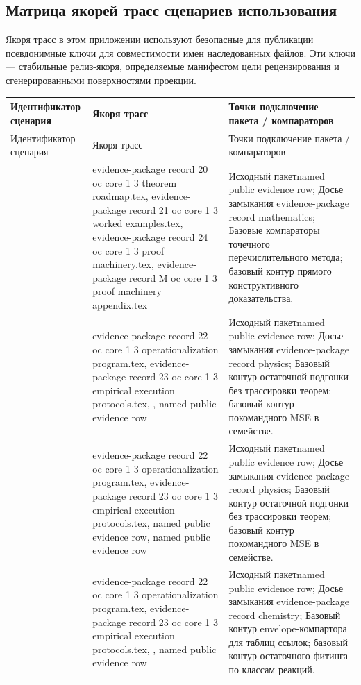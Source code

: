 \subsection{Матрица якорей трасс сценариев использования}
Якоря трасс в этом приложении используют безопасные для публикации псевдонимные ключи для совместимости имен наследованных файлов. Эти ключи — стабильные релиз-якоря, определяемые манифестом цели рецензирования и сгенерированными поверхностями проекции.
\begin{longtable}{@{}L{0.16\textwidth}L{0.38\textwidth}L{0.34\textwidth}@{}}
\toprule
Идентификатор сценария & Якоря трасс & Точки подключение пакета / компараторов \\
\midrule
\endfirsthead
\toprule
Идентификатор сценария & Якоря трасс & Точки подключение пакета / компараторов \\
\midrule
\endhead
{} & evidence-package record 20 oc core 1 3 theorem roadmap.tex, \allowbreak evidence-package record 21 oc core 1 3 worked examples.tex, \allowbreak evidence-package record 24 oc core 1 3 proof machinery.tex, \allowbreak evidence-package record M oc core 1 3 proof machinery appendix.tex & Исходный пакетnamed public evidence row; Досье замыкания evidence-package record mathematics; Базовые компараторы точечного перечислительного метода; базовый контур прямого конструктивного доказательства. \\
 & evidence-package record 22 oc core 1 3 operationalization program.tex, \allowbreak evidence-package record 23 oc core 1 3 empirical execution protocols.tex, \allowbreak {}, named public evidence row & Исходный пакетnamed public evidence row; Досье замыкания evidence-package record physics; Базовый контур остаточной подгонки без трассировки теорем; базовый контур покомандного MSE в семействе. \\
 & evidence-package record 22 oc core 1 3 operationalization program.tex, \allowbreak evidence-package record 23 oc core 1 3 empirical execution protocols.tex, named public evidence row, named public evidence row & Исходный пакетnamed public evidence row; Досье замыкания evidence-package record physics; Базовый контур остаточной подгонки без трассировки теорем; базовый контур покомандного MSE в семействе. \\
 & evidence-package record 22 oc core 1 3 operationalization program.tex, \allowbreak evidence-package record 23 oc core 1 3 empirical execution protocols.tex, \allowbreak {}, named public evidence row & Исходный пакетnamed public evidence row; Досье замыкания evidence-package record chemistry; Базовый контур envelope-компартора для таблиц ссылок; базовый контур остаточного фитинга по классам реакций. \\

\end{longtable}

